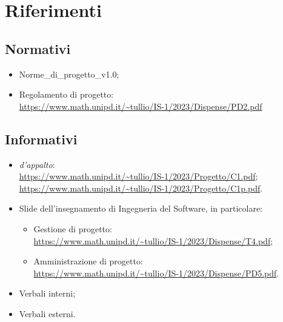 \section{Riferimenti}
    \subsection{Normativi}
        \begin{itemize}
            \item Norme\_di\_progetto\_v1.0;
            \item Regolamento di progetto:\\
                \url{https://www.math.unipd.it/~tullio/IS-1/2023/Dispense/PD2.pdf}
    \end{itemize}
    \subsection{Informativi}
    \begin{itemize}
            \item \textit{ d'appalto}:\\
                    \url{https://www.math.unipd.it/~tullio/IS-1/2023/Progetto/C1.pdf};\\
                    \url{https://www.math.unipd.it/~tullio/IS-1/2023/Progetto/C1p.pdf}.
            \item Slide dell'insegnamento di Ingegneria del Software, in particolare:
            \begin{itemize}
                \item Gestione di progetto:\\
                \url{https://www.math.unipd.it/~tullio/IS-1/2023/Dispense/T4.pdf};
                \item Amministrazione di progetto:\\
                \url{https://www.math.unipd.it/~tullio/IS-1/2023/Dispense/PD5.pdf}.
            \end{itemize}
            \item Verbali interni;
            \item Verbali esterni.
    \end{itemize}

    \newpage